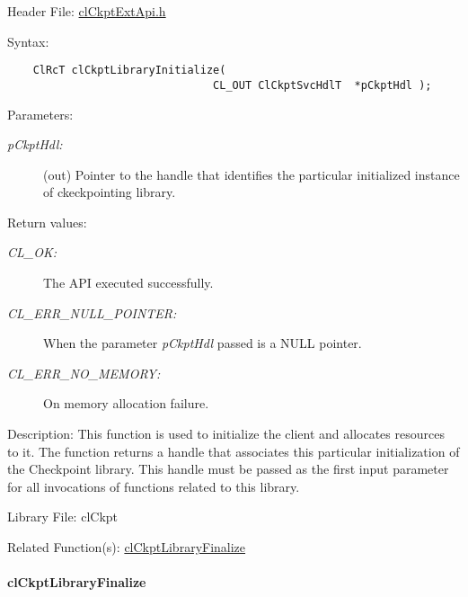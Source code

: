 \begin{Desc}
\item[Header File:]\hyperlink{cl_ckpt_ext_api_8h}{cl\-Ckpt\-Ext\-Api.h}\end{Desc}
\begin{Desc}
\item[Syntax:]

\footnotesize\begin{verbatim}    ClRcT clCkptLibraryInitialize(
                                CL_OUT ClCkptSvcHdlT  *pCkptHdl );
\end{verbatim}
\normalsize
\end{Desc}
\begin{Desc}
\item[Parameters:]
\begin{description}
\item[{\em p\-Ckpt\-Hdl:}](out) Pointer to the handle that identifies the particular initialized instance of ckeckpointing library.\end{description}
\end{Desc}
\begin{Desc}
\item[Return values:]
\begin{description}
\item[{\em CL\_\-OK:}]The API executed successfully. \item[{\em CL\_\-ERR\_\-NULL\_\-POINTER:}]When the parameter {\em p\-Ckpt\-Hdl\/} passed is a NULL pointer. \item[{\em CL\_\-ERR\_\-NO\_\-MEMORY:}]On memory allocation failure.\end{description}
\end{Desc}
\begin{Desc}
\item[Description:]This function is used to initialize the client and allocates resources to it. The function returns a handle that associates this particular initialization of the Checkpoint library. This handle must be passed as the first input parameter for all invocations of functions related to this library.\end{Desc}
\begin{Desc}
\item[Library File:]cl\-Ckpt\end{Desc}
\begin{Desc}
\item[Related Function(s):]\hyperlink{group__group10}{cl\-Ckpt\-Library\-Finalize} \end{Desc}
\hypertarget{pageckpt202}{}\paragraph{cl\-Ckpt\-Library\-Finalize}\label{pageckpt202}
